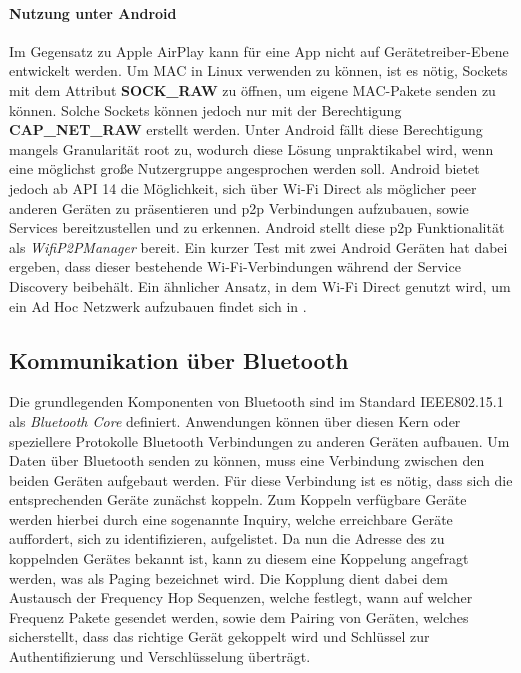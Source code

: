        \paragraph{Nutzung unter Android}
        Im Gegensatz zu Apple AirPlay kann für eine App nicht auf Gerätetreiber-Ebene entwickelt werden. Um MAC in Linux verwenden zu können, ist es nötig, Sockets mit dem Attribut {\bf SOCK\_RAW} zu öffnen,
        um eigene MAC-Pakete senden zu können. Solche Sockets können jedoch nur mit der Berechtigung {\bf CAP\_NET\_RAW} erstellt werden.\cite{AI-linuxPacket}
        Unter Android fällt diese Berechtigung mangels Granularität root zu, wodurch diese Lösung unpraktikabel wird,
        wenn eine möglichst große Nutzergruppe angesprochen werden soll.\cite{AI-androidRights}
        Android bietet jedoch ab API 14 die Möglichkeit, sich über Wi-Fi Direct als möglicher peer anderen Geräten zu präsentieren und
        p2p Verbindungen aufzubauen, sowie Services bereitzustellen und zu erkennen.
        Android stellt diese p2p Funktionalität als {\it WifiP2PManager} bereit. Ein kurzer Test mit zwei Android Geräten hat dabei ergeben,
        dass dieser bestehende Wi-Fi-Verbindungen während der Service Discovery beibehält.\cite{AI-test-repository}
        Ein ähnlicher Ansatz, in dem Wi-Fi Direct genutzt wird, um ein Ad Hoc Netzwerk aufzubauen findet sich in \cite{AI-Aneja}.

    \subsection{Kommunikation über Bluetooth}
        Die grundlegenden Komponenten von Bluetooth sind im Standard IEEE802.15.1 als {\it Bluetooth Core} definiert. Anwendungen können über diesen Kern oder speziellere Protokolle Bluetooth
        Verbindungen zu anderen Geräten aufbauen.\cite[S.228]{AI-Lueders}
        Um Daten über Bluetooth senden zu können, muss eine Verbindung zwischen den beiden Geräten aufgebaut werden. Für diese Verbindung ist es nötig,
        dass sich die entsprechenden Geräte zunächst koppeln. Zum Koppeln verfügbare Geräte werden hierbei durch eine sogenannte Inquiry, welche erreichbare Geräte auffordert,
        sich zu identifizieren, aufgelistet. Da nun die Adresse des zu koppelnden Gerätes bekannt ist, kann zu diesem eine Koppelung angefragt werden, was als Paging bezeichnet wird.
        Die Kopplung dient dabei dem Austausch der Frequency Hop Sequenzen, welche festlegt, wann auf welcher Frequenz Pakete gesendet werden, sowie dem Pairing von Geräten, welches sicherstellt,
        dass das richtige Gerät gekoppelt wird und Schlüssel zur Authentifizierung und Verschlüsselung überträgt.\cite[S.402f.]{AI-Sauter}

